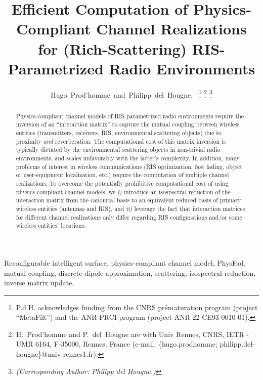 \documentclass[journal,12pt,onecolumn,draftclsnofoot]{IEEEtran}
\begin{document}
\title{Efficient Computation of Physics-Compliant Channel Realizations for (Rich-Scattering) RIS-Parametrized Radio Environments}



\author{Hugo~Prod'homme~and~Philipp~del~Hougne,~
\thanks{P.d.H. acknowledges funding from the CNRS pr\'{e}maturation program (project ``MetaFilt'') and the ANR PRCI program (project ANR-22-CE93-0010-01).
}
\thanks{
H.~Prod'homme and P.~del~Hougne are with Univ Rennes, CNRS, IETR - UMR 6164, F-35000, Rennes, France (e-mail: \{hugo.prodhomme; philipp.del-hougne\}@univ-rennes1.fr).
}
\thanks{\textit{(Corresponding Author: Philipp del Hougne.)}}
}












\maketitle


\begin{abstract}
Physics-compliant channel models of RIS-parametrized radio environments require the inversion of an ``interaction matrix'' to capture the mutual coupling between wireless entities (transmitters, receivers, RIS, environmental scattering objects) due to proximity \textit{and} reverberation. 
The computational cost of this matrix inversion is typically dictated by the environmental scattering objects in non-trivial radio environments, and scales unfavorably with the latter's complexity.
In addition, many problems of interest in wireless communications (RIS optimization, fast fading, object or user-equipment localization, etc.) require the computation of multiple channel realizations. 
To overcome the potentially prohibitive computational cost of using physics-compliant channel models, we \textit{i)} introduce an isospectral reduction of the interaction matrix from the canonical basis to an equivalent reduced basis of primary wireless entities (antennas and RIS), and \textit{ii)} leverage the fact that interaction matrices for different channel realizations only differ regarding RIS configurations and/or some wireless entities’ locations.
\end{abstract}

\begin{IEEEkeywords}
Reconfigurable intelligent surface, physics-compliant channel model, PhysFad, mutual coupling, discrete dipole approximation, scattering, isospectral reduction, inverse matrix update.
\end{IEEEkeywords}
\end{document}
